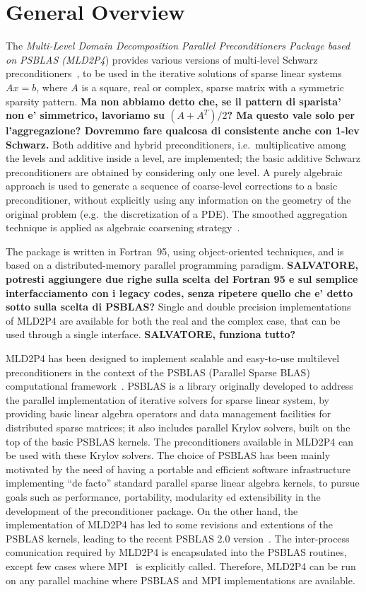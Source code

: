 \section{General Overview\label{sec:overview}}

The \emph{Multi-Level Domain Decomposition Parallel Preconditioners Package based on
PSBLAS (MLD2P4}) provides various versions of multi-level Schwarz preconditioners~\cite{DD2},
to be used in the iterative solutions of sparse linear systems $Ax=b$, where
$A$ is a square, real or complex, sparse matrix with a symmetric sparsity pattern.
\textbf{Ma non abbiamo detto che, se il pattern di sparista' non e' simmetrico,
lavoriamo su $(A+A^T)/2$? Ma questo vale solo per l'aggregazione? Dovremmo fare
qualcosa di consistente anche con 1-lev Schwarz.}
Both additive and hybrid preconditioners, i.e.\ multiplicative among the levels
and additive inside a level, are implemented; the basic additive Schwarz preconditioners
are obtained by considering only one level. A purely algebraic approach is used to
generate a sequence of coarse-level corrections to a basic preconditioner, without
explicitly using any information on the geometry of the original problem (e.g.\ the
discretization of a PDE). The smoothed aggregation technique is applied
as algebraic coarsening strategy~\cite{}.

The package is written in Fortran~95, using object-oriented techniques,
and is based on a distributed-memory parallel programming paradigm. \textbf{SALVATORE,
potresti aggiungere due righe sulla scelta del Fortran 95 e sul semplice interfacciamento
con i legacy codes, senza ripetere quello che e' detto sotto sulla scelta di PSBLAS?}
Single and double precision implementations of MLD2P4 are available for both the
real and the complex case, that can be used through a single interface.
\textbf{SALVATORE, funziona tutto?}

MLD2P4 has been designed to implement scalable and easy-to-use multilevel preconditioners
in the context of the PSBLAS (Parallel Sparse BLAS) computational framework~\cite{}.
PSBLAS is a library originally developed to address the parallel implementation of
iterative solvers for sparse linear system, by providing basic linear algebra
operators and data management facilities for distributed sparse matrices; it
also includes parallel Krylov solvers, built on the top of the basic PSBLAS kernels.
The preconditioners available in MLD2P4 can be used with these Krylov solvers.
The choice of PSBLAS has been mainly motivated by the need of having
a portable and efficient software infrastructure implementing ``de facto'' standard
parallel sparse linear algebra kernels, to pursue goals such as performance,
portability, modularity ed extensibility in the development of the preconditioner
package. On the other hand, the implementation of MLD2P4 has led to some
revisions and extentions of the PSBLAS kernels, leading to the
recent PSBLAS 2.0 version~\cite{}. The inter-process comunication required
by MLD2P4 is encapsulated into the PSBLAS routines, except few cases where
MPI~\cite{} is explicitly called. Therefore, MLD2P4 can be run on any parallel
machine where PSBLAS and MPI implementations are available.

